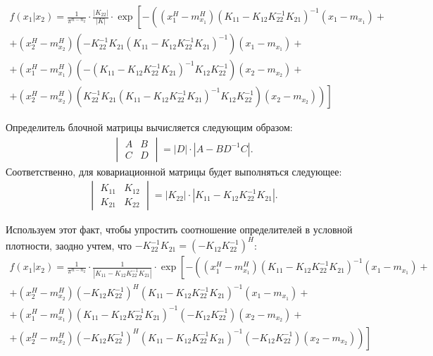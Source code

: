 \documentclass[11pt]{article}
\begin{document}
\begin{equation*}
\begin{gathered}
f(x_1|x_2)=\frac{1}{\pi^{n-n_2}}\cdot \frac{|K_{22}|}{|K|}\cdot \exp \left[-\left((x_1^H-m_{x_1}^H)(K_{11}-K_{12}K_{22}^{-1}K_{21})^{-1}(x_1-m_{x_1})+ \right.\right.
\\
+(x_2^H-m_{x_2}^H)(-K_{22}^{-1}K_{21}(K_{11}-K_{12}K_{22}^{-1}K_{21})^{-1})(x_1-m_{x_1})+
\\
+(x_1^H-m_{x_1}^H)(-(K_{11}-K_{12}K_{22}^{-1}K_{21})^{-1}K_{12}K_{22}^{-1})(x_2-m_{x_2})+
\\
\left.\left.+(x_2^H-m_{x_2}^H)(K_{22}^{-1}K_{21}(K_{11}-K_{12}K_{22}^{-1}K_{21})^{-1}K_{12}K_{22}^{-1})(x_2-m_{x_2})\right)\right]
\end{gathered}
\end{equation*}

Определитель блочной матрицы вычисляется следующим образом:
\begin{gather}
\begin{vmatrix}
A & B \\
C & D
\end{vmatrix}
=
|D|\cdot |A-BD^{-1}C|.
\end{gather}
Соответственно, для ковариационной матрицы будет выполняться следующее:
\begin{align}
\begin{vmatrix}
K_{11} & K_{12} \\
K_{21} & K_{22}
\end{vmatrix}
=
|K_{22}|\cdot |K_{11}-K_{12}K_{22}^{-1}K_{21}|.
\nonumber
\end{align}



Используем этот факт, чтобы упростить соотношение определителей в условной плотности, заодно учтем, что $-K_{22}^{-1}K_{21}=(-K_{12}K_{22}^{-1})^H$:
\begin{equation*}
\begin{gathered}
f(x_1|x_2)=\frac{1}{\pi^{n-n_2}}\cdot \frac{1}{ |K_{11}-K_{12}K_{22}^{-1}K_{21}|}\cdot \exp \left[-\left((x_1^H-m_{x_1}^H)(K_{11}-K_{12}K_{22}^{-1}K_{21})^{-1}(x_1-m_{x_1})+ \right.\right.
\\
+(x_2^H-m_{x_2}^H)(-K_{12}K_{22}^{-1})^H(K_{11}-K_{12}K_{22}^{-1}K_{21})^{-1}(x_1-m_{x_1})+
\\
+(x_1^H-m_{x_1}^H)(K_{11}-K_{12}K_{22}^{-1}K_{21})^{-1}(-K_{12}K_{22}^{-1})(x_2-m_{x_2})+
\\
\left.\left.+(x_2^H-m_{x_2}^H)(-K_{12}K_{22}^{-1})^H(K_{11}-K_{12}K_{22}^{-1}K_{21})^{-1}(-K_{12}K_{22}^{-1})(x_2-m_{x_2})\right)\right]
\end{gathered}
\end{equation*}
\end{document}
